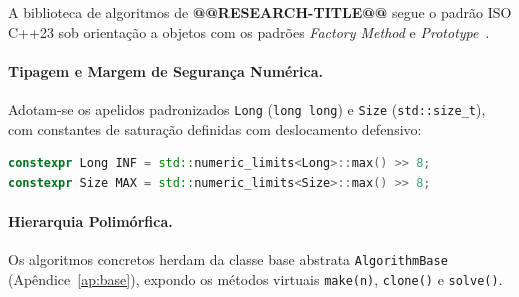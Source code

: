 \label{ap:arquitetura}

A biblioteca de algoritmos de \textbf{@@RESEARCH-TITLE@@} segue o padrão ISO C++23 sob orientação a objetos com os padrões \textit{Factory Method} e \textit{Prototype}~\cite{gamma1994design}.

\paragraph{Tipagem e Margem de Segurança Numérica.}
Adotam-se os apelidos padronizados \lstinline{Long} (\lstinline{long long}) e \lstinline{Size} (\lstinline{std::size_t}), com constantes de saturação definidas com deslocamento defensivo:
\begin{lstlisting}[language=C++, numbers=none, basicstyle=\ttfamily\footnotesize, frame=none, backgroundcolor=\color{white}]
constexpr Long INF = std::numeric_limits<Long>::max() >> 8;
constexpr Size MAX = std::numeric_limits<Size>::max() >> 8;
\end{lstlisting}

\paragraph{Hierarquia Polimórfica.}
Os algoritmos concretos herdam da classe base abstrata \lstinline{AlgorithmBase} (Apêndice~\ref{ap:base}), expondo os métodos virtuais \lstinline{make(n)}, \lstinline{clone()} e \lstinline{solve()}.

